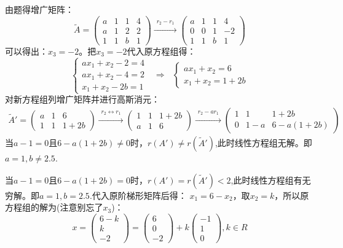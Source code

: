 \documentclass[a4paper]{report}
\begin{document}
\begin{jie}
由题得增广矩阵：
\begin{equation*}
\widetilde{A}=
\begin{pmatrix}
a&1&1&4\\
a&1&2&2\\
1&1&b&1
\end{pmatrix}\xrightarrow{\substack{r_2-r_1}}
{
\begin{pmatrix}
a&1&1&4\\
0&0&1&-2\\
1&1&b&1
\end{pmatrix}
}
\end{equation*}
可以得出：$x_3=-2$。把$x_3=-2$代入原方程组得：
\begin{equation*}
\begin{cases}
ax_1+x_2-2=4\\
ax_1+x_2-4=2\\
x_1+x_2-2b=1
\end{cases}~~~\Rightarrow~~~
\begin{cases}
ax_1+x_2=6\\
x_1+x_2=1+2b
\end{cases}
\end{equation*}
对新方程组列增广矩阵并进行高斯消元：
\begin{align*}
\widetilde{A}'=
\begin{pmatrix}
a&1&6\\
1&1&1+2b
\end{pmatrix}\xrightarrow{\substack{r_2\leftrightarrow r_1}}
{
\begin{pmatrix}
1&1&1+2b\\
a&1&6
\end{pmatrix}
}\xrightarrow{\substack{r_2-a r_1}}
{
\begin{pmatrix}
1&1&1+2b\\
0&1-a&6-a(1+2b)
\end{pmatrix}
}
\end{align*}
当$a-1=0$且$6-a(1+2b)\neq 0$时，$r(A')\neq r(\widetilde{A}')$,此时线性方程组无解。即$a=1,b\neq 2.5$.

当$a-1=0$且$6-a(1+2b)=0$时，$r(A')=r(\widetilde{A}')<2$,此时线性方程组有无穷解。即$a=1,b= 2.5$.代入原阶梯形矩阵后得：
$x_1=6-x_2$，取$x_2=k$，所以原方程组的解为(注意别忘了$x_3$)：
\begin{equation*}
  x=
  \begin{pmatrix}
   6-k\\ k\\ -2
  \end{pmatrix}=
  \begin{pmatrix}
    6\\ 0\\ -2
  \end{pmatrix}+k\begin{pmatrix}
                  -1\\ 1\\ 0
                \end{pmatrix},k\in R
\end{equation*}


\end{jie}
\end{document}
